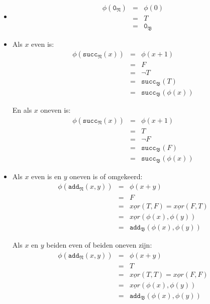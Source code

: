 \documentclass[a4paper,11pt]{article}
\begin{document}
\begin{enumerate}
\begin{itemize}
\item
\begin{eqnarray*}
\phi(\texttt{0}_{\mathfrak{N}}) & = & \phi(0) \\
                                & = & T \\
                                & = & \texttt{0}_{\mathfrak{B}}
\end{eqnarray*}

\item
Als $x$ even is:
\begin{eqnarray*}
\phi(\texttt{succ}_{\mathfrak{N}}(x)) & = & \phi(x+1) \\
                                      & = & F \\
                                      & = & \neg T \\
                                      & = & \texttt{succ}_{\mathfrak{B}}(T) \\
                                      & = & \texttt{succ}_{\mathfrak{B}}(\phi(x))
\end{eqnarray*}

En als $x$ oneven is:
\begin{eqnarray*}
\phi(\texttt{succ}_{\mathfrak{N}}(x)) & = & \phi(x+1) \\
                                      & = & T \\
                                      & = & \neg F \\
                                      & = & \texttt{succ}_{\mathfrak{B}}(F) \\
                                      & = & \texttt{succ}_{\mathfrak{B}}(\phi(x))
\end{eqnarray*}

\item
Als $x$ even is en $y$ oneven is of omgekeerd:
\begin{eqnarray*}
\phi(\texttt{add}_{\mathfrak{N}}(x,y)) & = & \phi(x+y) \\
                                       & = & F \\
                                       & = & \underline{xor}(T, F) = \underline{xor}(F, T) \\
                                       & = & \underline{xor}(\phi(x), \phi(y)) \\
                                       & = & \texttt{add}_{\mathfrak{B}}(\phi(x),\phi(y))
\end{eqnarray*}

Als $x$ en $y$ beiden even of beiden oneven zijn:
\begin{eqnarray*}
\phi(\texttt{add}_{\mathfrak{N}}(x,y)) & = & \phi(x+y) \\
                                       & = & T \\
                                       & = & \underline{xor}(T, T) = \underline{xor}(F, F) \\
                                       & = & \underline{xor}(\phi(x), \phi(y)) \\
                                       & = & \texttt{add}_{\mathfrak{B}}(\phi(x),\phi(y))
\end{eqnarray*}


\end{itemize}
\end{enumerate}
\end{document}
